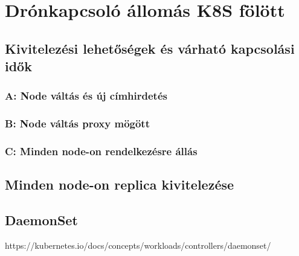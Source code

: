 \chapter{Drónkapcsoló állomás K8S fölött}

\section{Kivitelezési lehetőségek és várható kapcsolási idők}
\subsection{A: Node váltás és új címhirdetés}
\subsection{B: Node váltás proxy mögött}
\subsection{C: Minden node-on rendelkezésre állás}

\section{Minden node-on replica kivitelezése}

\section{DaemonSet}
https://kubernetes.io/docs/concepts/workloads/controllers/daemonset/